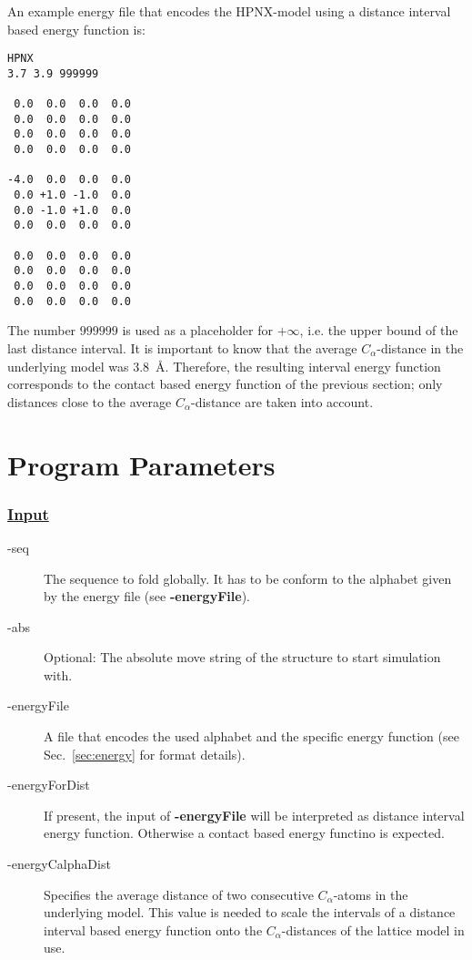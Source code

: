 \documentclass{article}
\newenvironment{boxit}{\begin{lrbox}{\savepar}\begin{minipage}[t]{0.8\textwidth}}
                      {\end{minipage}\end{lrbox}\fbox{\usebox{\savepar}}}
\begin{document}
An example energy file that encodes the HPNX-model using a distance interval
based energy function is:

\begin{center}
\begin{boxit}
\small
\begin{verbatim}
HPNX
3.7 3.9 999999

 0.0  0.0  0.0  0.0
 0.0  0.0  0.0  0.0
 0.0  0.0  0.0  0.0
 0.0  0.0  0.0  0.0

-4.0  0.0  0.0  0.0
 0.0 +1.0 -1.0  0.0
 0.0 -1.0 +1.0  0.0
 0.0  0.0  0.0  0.0

 0.0  0.0  0.0  0.0
 0.0  0.0  0.0  0.0
 0.0  0.0  0.0  0.0
 0.0  0.0  0.0  0.0
\end{verbatim}
\end{boxit}
\end{center}

The number $999999$ is used as a placeholder for $+\infty$, i.e. the upper bound
of the last distance interval. It is important to know that the average
$C_\alpha$-distance in the underlying model was 3.8~\AA. Therefore, the resulting
interval energy function corresponds to the contact based energy function of the
previous section; only distances close to the average $C_\alpha$-distance are
taken into account.


\section{Program Parameters}
\label{sec:parameter}

\subsubsection*{\underline{ Input }}

\begin{description}
	\item[-seq] The sequence to fold globally. It has to be conform
	to the alphabet given by the energy file (see {\bfseries -energyFile}).
	\item[-abs] Optional: The absolute move string of the structure to start 
	simulation with.
	\item[-energyFile] A file that encodes the used alphabet and the
	specific energy function (see Sec.~\ref{sec:energy} for format details).
	\item[-energyForDist] If present, the input of {\bfseries -energyFile} will be
	interpreted as distance interval energy function. Otherwise a contact based
	energy functino is expected.
	\item[-energyCalphaDist] Specifies the average distance of two
	consecutive $C_\alpha$-atoms in the underlying model. This value is needed to
	scale the intervals of a distance interval based energy function onto the
	$C_\alpha$-distances of the lattice model in use.
\end{description}
\end{document}
